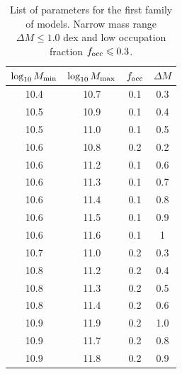 \documentclass[usenatbib]{mn2e}
\begin{document}
\begin{table}
\begin{center}
\begin{tabular}{cccc}\hline\hline
$\log_{10}M_{\rm min}$ & $\log_{10}M_{\rm max}$ & $f_{\rm occ}$ & $\Delta M$\\\hline
 10.4 &10.7 & 0.1& 0.3 \\
 10.5 &10.9 & 0.1& 0.4 \\
 10.5 &11.0 & 0.1& 0.5 \\
 10.6 &10.8 & 0.2& 0.2 \\
 10.6 &11.2 & 0.1& 0.6 \\
 10.6 &11.3 & 0.1& 0.7 \\
 10.6 &11.4 & 0.1& 0.8 \\
 10.6 &11.5 & 0.1& 0.9 \\
 10.6 &11.6 & 0.1& 1 \\
 10.7 &11.0 & 0.2& 0.3 \\
 10.8 &11.2 & 0.2& 0.4 \\
 10.8 &11.3 & 0.2& 0.5 \\
 10.8 &11.4 & 0.2& 0.6 \\
 10.9 &11.9 & 0.2& 1.0 \\
 10.9 &11.7 & 0.2& 0.8 \\
 10.9 &11.8 & 0.2& 0.9 \\\hline
\end{tabular}
\end{center}
\caption{\label{table:firstfamily}
List of parameters for the first
  family of models. Narrow mass range $\Delta M\leq 1.0$ dex and low
  occupation fraction $f_{\rm occ}\leq 0.3$.} 
\end{table}
\end{document}
